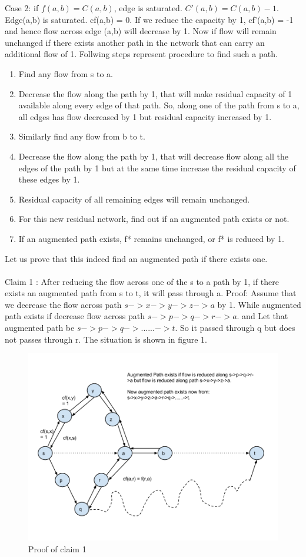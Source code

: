 	Case 2: if $f(a,b) = C(a,b)$, edge is saturated. $C'(a,b) = C(a,b) - 1$. 
	Edge(a,b) is saturated. cf(a,b) = 0. If we reduce the capacity by 1, cf'(a,b) = -1 and hence flow across edge (a,b) will decrease by 1. Now if flow will remain unchanged if there exists another path in the network that can carry an additional flow of 1. Follwing steps represent procedure to find such a path.
	\begin{enumerate}
	\item Find any flow from s to a. 
	\item Decrease the flow along the path by 1, that will make residual capacity of 1 available along every edge of that path. So, along one of the path from s to a, all edges has flow decreased by 1 but residual capacity increased by 1. 
	\item Similarly find any flow from b to t.
	\item Decrease the flow along the path by 1, that will decrease flow along all the edges of the path by 1 but at the same time increase the residual capacity of these edges by 1. 
	\item Residual capacity of all remaining edges will remain unchanged. 
	\item For this new residual network, find out if an augmented path exists or not.
	\item If an augmented path exists, f* remains unchanged, or f* is reduced by 1. 
	\end{enumerate}		
	
	Let us prove that this indeed find an augmented path if there exists one.	
	\\
	\\
	Claim 1 : After reducing the flow across one of the s to a path by 1, if there exists an augmented path from s to t, it will pass through a. 
	Proof:	
	Assume that we decrease the flow across path $s->x->y->z->a$  by 1. While augmented path exists if decrease flow across path $s->p->q->r->a$. and Let that augmented path be $s->p->q->......->t$. So it passed through q but does not passes through r.
	The situation is shown in figure 1.
	\begin{figure}[1a]
    \centering
    \includegraphics[scale=0.40]{1a}
    \caption{Proof of claim 1}
    \label{fig:1a}
\end{figure}
 
